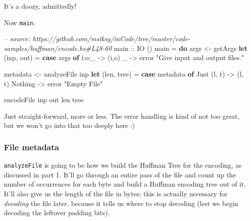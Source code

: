 \documentclass[]{article}
\newenvironment{Shaded}{}{}
\newcommand{\KeywordTok}[1]{\textcolor[rgb]{0.00,0.44,0.13}{\textbf{{#1}}}}
\newcommand{\DataTypeTok}[1]{\textcolor[rgb]{0.56,0.13,0.00}{{#1}}}
\newcommand{\StringTok}[1]{\textcolor[rgb]{0.25,0.44,0.63}{{#1}}}
\newcommand{\CommentTok}[1]{\textcolor[rgb]{0.38,0.63,0.69}{\textit{{#1}}}}
\newcommand{\OtherTok}[1]{\textcolor[rgb]{0.00,0.44,0.13}{{#1}}}
\newcommand{\FunctionTok}[1]{\textcolor[rgb]{0.02,0.16,0.49}{{#1}}}
\newcommand{\NormalTok}[1]{{#1}}
\begin{document}
It's a doozy, admittedly!

Now \texttt{main}:

\begin{Shaded}
\begin{Highlighting}[]
\CommentTok{-- source: https://github.com/mstksg/inCode/tree/master/code-samples/huffman/encode.hs#L48-60}
\OtherTok{main ::} \DataTypeTok{IO} \NormalTok{()}
\NormalTok{main }\FunctionTok{=} \KeywordTok{do}
    \NormalTok{args     }\OtherTok{<-} \NormalTok{getArgs}
    \KeywordTok{let} \NormalTok{(inp, out)  }\FunctionTok{=} \KeywordTok{case} \NormalTok{args }\KeywordTok{of}
                        \NormalTok{i}\FunctionTok{:}\NormalTok{o}\FunctionTok{:}\NormalTok{_      }\OtherTok{->} \NormalTok{(i,o)}
                        \NormalTok{_          }\OtherTok{->} \NormalTok{error }\StringTok{"Give input and output files."}

    \NormalTok{metadata }\OtherTok{<-} \NormalTok{analyzeFile inp}
    \KeywordTok{let} \NormalTok{(len, tree) }\FunctionTok{=} \KeywordTok{case} \NormalTok{metadata }\KeywordTok{of}
                        \DataTypeTok{Just} \NormalTok{(l, t) }\OtherTok{->} \NormalTok{(l, t)}
                        \DataTypeTok{Nothing}     \OtherTok{->} \NormalTok{error }\StringTok{"Empty File"}

    \NormalTok{encodeFile inp out len tree}
\end{Highlighting}
\end{Shaded}

Just straight-forward, more or less. The error handling is kind of not
too great, but we won't go into that too deeply here :)

\subsubsection{File metadata}\label{file-metadata}

\texttt{analyzeFile} is going to be how we build the Huffman Tree for
the encoding, as discussed in part 1. It'll go through an entire pass of
the file and count up the number of occurrences for each byte and build
a Huffman encoding tree out of it. It'll also give us the length of the
file in bytes; this is actually necessary for \emph{decoding} the file
later, because it tells us where to stop decoding (lest we begin
decoding the leftover padding bits).
\end{document}

